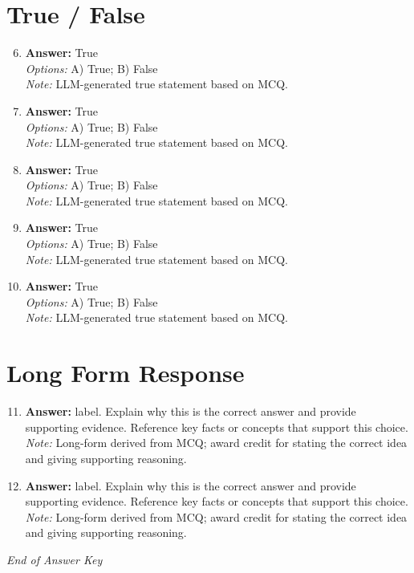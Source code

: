 \documentclass[12pt]{article}
\begin{document}
\section*{True / False}
\begin{enumerate}[label=\arabic*.]
\setcounter{enumi}{5}
\item \textbf{Answer:} True
\\ \textit{Options:} A) True; B) False
\\ \textit{Note:} LLM-generated true statement based on MCQ.
\item \textbf{Answer:} True
\\ \textit{Options:} A) True; B) False
\\ \textit{Note:} LLM-generated true statement based on MCQ.
\item \textbf{Answer:} True
\\ \textit{Options:} A) True; B) False
\\ \textit{Note:} LLM-generated true statement based on MCQ.
\item \textbf{Answer:} True
\\ \textit{Options:} A) True; B) False
\\ \textit{Note:} LLM-generated true statement based on MCQ.
\item \textbf{Answer:} True
\\ \textit{Options:} A) True; B) False
\\ \textit{Note:} LLM-generated true statement based on MCQ.
\end{enumerate}

\section*{Long Form Response}
\begin{enumerate}[label=\arabic*.]
\setcounter{enumi}{10}
\item \textbf{Answer:} label. Explain why this is the correct answer and provide supporting evidence. Reference key facts or concepts that support this choice.
\\ \textit{Note:} Long-form derived from MCQ; award credit for stating the correct idea and giving supporting reasoning.
\item \textbf{Answer:} label. Explain why this is the correct answer and provide supporting evidence. Reference key facts or concepts that support this choice.
\\ \textit{Note:} Long-form derived from MCQ; award credit for stating the correct idea and giving supporting reasoning.
\end{enumerate}

\vfill
\noindent\textit{End of Answer Key}
\end{document}
